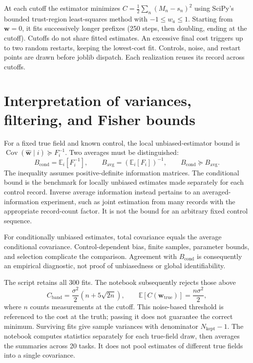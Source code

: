 \documentclass[11pt]{article}
\newcommand{\Cov}{\operatorname{Cov}}
\newcommand{\E}{\mathbb{E}}
\begin{document}
At each cutoff the estimator minimizes $C=\frac12\sum_n(M_n-s_n)^2$ using
SciPy's bounded trust-region least-squares method with $-1\le w_a\le1$.
Starting from $\bm w=0$, it fits successively longer prefixes (250 steps, then
doubling, ending at the cutoff). Cutoffs do not share fitted estimates.
An excessive final cost triggers up to two random restarts, keeping the
lowest-cost fit. Controls, noise, and restart points are drawn before joblib
dispatch. Each realization reuses its record across cutoffs.

\section{Interpretation of variances, filtering, and Fisher bounds}
\label{sec:statistics}

For a fixed true field and known control, the local unbiased-estimator bound is
$\Cov(\hat{\bm w}\mid i)\succeq F_i^{-1}$. Two averages must be distinguished:
\begin{equation}
 B_{\mathrm{cond}}=\E_i[F_i^{-1}],\qquad
 B_{\mathrm{avg}}=(\E_i[F_i])^{-1},\qquad
 B_{\mathrm{cond}}\succeq B_{\mathrm{avg}}.
 \label{eq:bounds}
\end{equation}
The inequality assumes positive-definite information matrices. The conditional
bound is the benchmark for locally unbiased estimates made separately for
each control record. Inverse average information instead pertains to an
averaged-information experiment, such as joint estimation from many records
with the appropriate record-count factor. It is not the bound for an arbitrary
fixed control sequence.

For conditionally unbiased estimates, total covariance equals the average
conditional covariance. Control-dependent bias, finite samples, parameter
bounds, and selection complicate the comparison. Agreement with
$B_{\mathrm{cond}}$ is consequently an empirical diagnostic, not proof of
unbiasedness or global identifiability.

The script retains all 300 fits. The notebook subsequently rejects those above
\begin{equation}
 C_{\mathrm{band}}=\frac{\sigma^2}{2}(n+5\sqrt{2n}),\qquad
 \E[C(\bm w_{\mathrm{true}})]=\frac{n\sigma^2}{2},
 \label{eq:costband}
\end{equation}
where $n$ counts measurements at the cutoff. This noise-based threshold is
referenced to the cost at the truth; passing it does not guarantee the correct
minimum. Surviving fits give sample variances with denominator
$N_{\mathrm{kept}}-1$. The notebook computes statistics separately for each
true-field draw, then averages the summaries across 20 tasks. It does not pool
estimates of different true fields into a single covariance.
\end{document}
